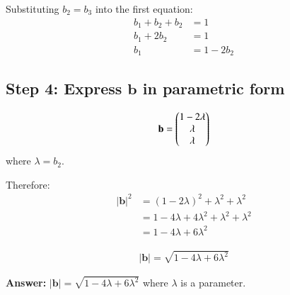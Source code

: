 \documentclass[journal]{IEEEtran}
\begin{document}
	Substituting $b_2 = b_3$ into the first equation:
	\begin{align}
		b_1 + b_2 + b_2 &= 1\\
		b_1 + 2b_2 &= 1\\
		b_1 &= 1 - 2b_2
	\end{align}
	
	\subsection*{Step 4: Express $\mathbf{b}$ in parametric form}
	\begin{align}
		\mathbf{b} = \begin{pmatrix}1 - 2\lambda\\\lambda\\\lambda\end{pmatrix}
	\end{align}
	where $\lambda = b_2$.
	
	Therefore:
	\begin{align}
		|\mathbf{b}|^2 &= (1 - 2\lambda)^2 + \lambda^2 + \lambda^2\\
		&= 1 - 4\lambda + 4\lambda^2 + \lambda^2 + \lambda^2\\
		&= 1 - 4\lambda + 6\lambda^2
	\end{align}
	
	\begin{align}
		|\mathbf{b}| = \sqrt{1 - 4\lambda + 6\lambda^2}
	\end{align}
	
	\textbf{Answer:} $|\mathbf{b}| = \sqrt{1 - 4\lambda + 6\lambda^2}$ where $\lambda$ is a parameter.
	
\end{document}
